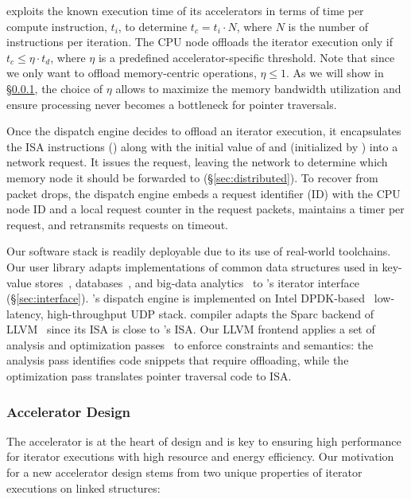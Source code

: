 \pulse exploits the known execution time of its accelerators in terms of time per compute instruction, $t_i$, to determine $t_c = t_i \cdot N$, where $N$ is the number of instructions per iteration. The CPU node offloads the iterator execution only if $t_c \leq \eta \cdot t_d$, where $\eta$ is a predefined accelerator-specific threshold. Note that since we only want to offload memory-centric operations, $\eta \leq 1$. As we will show in \S\ref{ssec:architecture}, the choice of $\eta$ allows \pulse to maximize the memory bandwidth utilization and ensure processing never becomes a bottleneck for pointer traversals.


 Once the dispatch engine decides to offload an iterator execution, it encapsulates the ISA instructions () along with the initial value of  and  (initialized by ) into a network request. It issues the request, leaving the network to determine which memory node it should be forwarded to (\S\ref{sec:distributed}). To recover from packet drops, the dispatch engine embeds a request identifier (ID) with the CPU node ID and a local request counter in the request packets, maintains a timer per request, and retransmits requests on timeout.

 Our software stack is readily deployable due to its use of real-world toolchains. Our user library adapts implementations of common data structures used in key-value stores~\cite{redis, memcached}, databases~\cite{wiredtiger, btree1, btree2, trie1, trie3}, and big-data analytics~\cite{powergraph, graphx, graphchi, pagerank} to \pulse's iterator interface (\S\ref{sec:interface}). \pulse's dispatch engine is implemented on Intel DPDK-based~\cite{dpdk} low-latency, high-throughput UDP stack. \pulse compiler adapts the Sparc backend of LLVM~\cite{llvmsparc} since its ISA is close to \pulse's ISA. Our LLVM frontend applies a set of analysis and optimization passes~\cite{llvmpass} to enforce \pulse constraints and semantics: the analysis pass identifies code snippets that require offloading, while the optimization pass translates pointer traversal code to \pulse ISA.


\subsubsection{\pulse Accelerator Design}
\label{ssec:architecture}
\label{ssec:traversalexample}
The accelerator is at the heart of \pulse design and is key to ensuring high performance for iterator executions with high resource and energy efficiency. Our motivation for a new accelerator design stems from two unique properties of iterator executions on linked structures: 



